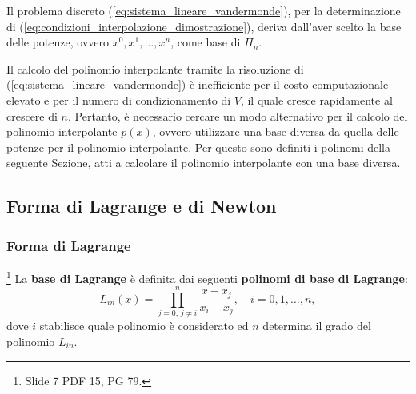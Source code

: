 Il problema discreto (\ref{eq:sistema_lineare_vandermonde}), per la determinazione di (\ref{eq:condizioni_interpolazione_dimostrazione}), deriva dall'aver scelto la base delle potenze, ovvero ${x^0,x^1,\hdots, x^n}$, come base di $\Pi_n$.

Il calcolo del polinomio interpolante tramite la risoluzione di (\ref{eq:sistema_lineare_vandermonde}) è inefficiente per il costo computazionale elevato e per il numero di condizionamento di $V$, il quale cresce rapidamente al crescere di $n$. Pertanto, è necessario cercare un modo alternativo per il calcolo del polinomio interpolante $p(x)$, ovvero utilizzare una base diversa da quella delle potenze per il polinomio interpolante. Per questo sono definiti i polinomi della seguente Sezione, atti a calcolare il polinomio interpolante con una base diversa.

\subsection{Forma di Lagrange e di Newton}

\subsubsection{Forma di Lagrange}

\begin{definition}\footnote{Slide 7 PDF 15, PG 79.}
    La \textbf{base di Lagrange} è definita dai seguenti \textbf{polinomi di base di Lagrange}:
    \begin{equation}\label{eq:polinomi_lagrange}
        L_{in}(x)=\prod_{j=0,\,j\neq i}^{n} \frac{x-x_j}{x_i-x_j},\quad i=0,1,\hdots,n, 
    \end{equation}
    dove $i$ stabilisce quale polinomio è considerato ed $n$ determina il grado del polinomio $L_{in}$.
\end{definition}


